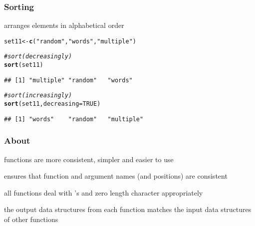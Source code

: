 \documentclass[12pt]{beamer}\usepackage[]{graphicx}\usepackage[]{color}
\makeatletter
\newcommand{\hlnum}[1]{\textcolor[rgb]{0.686,0.059,0.569}{#1}}%
\newcommand{\hlstr}[1]{\textcolor[rgb]{0.192,0.494,0.8}{#1}}%
\newcommand{\hlcom}[1]{\textcolor[rgb]{0.678,0.584,0.686}{\textit{#1}}}%
\newcommand{\hlstd}[1]{\textcolor[rgb]{0.345,0.345,0.345}{#1}}%
\newcommand{\hlkwb}[1]{\textcolor[rgb]{0.69,0.353,0.396}{#1}}%
\newcommand{\hlkwc}[1]{\textcolor[rgb]{0.333,0.667,0.333}{#1}}%
\newcommand{\hlkwd}[1]{\textcolor[rgb]{0.737,0.353,0.396}{\textbf{#1}}}%
\newenvironment{kframe}{%
 \def\at@end@of@kframe{}%
 \ifinner\ifhmode%
  \def\at@end@of@kframe{\end{minipage}}%
  \begin{minipage}{\columnwidth}%
 \fi\fi%
 \def\FrameCommand##1{\hskip\@totalleftmargin \hskip-\fboxsep
 \colorbox{shadecolor}{##1}\hskip-\fboxsep
     \hskip-\linewidth \hskip-\@totalleftmargin \hskip\columnwidth}%
 \MakeFramed {\advance\hsize-\width
   \@totalleftmargin\z@ \linewidth\hsize
   \@setminipage}}%
 {\par\unskip\endMakeFramed%
 \at@end@of@kframe}
\newenvironment{knitrout}{}{} %
\makeatother
\begin{document}

\begin{frame}[fragile]
\frametitle{Sorting}

 arranges elements in alphabetical order
\begin{knitrout}\footnotesize
{}\color{fgcolor}\begin{kframe}
\begin{alltt}
\hlstd{set11} \hlkwb{<-} \hlkwd{c}\hlstd{(}\hlstr{"random"}\hlstd{,} \hlstr{"words"}\hlstd{,} \hlstr{"multiple"}\hlstd{)}

\hlcom{# sort (decreasingly)}
\hlkwd{sort}\hlstd{(set11)}
\end{alltt}
\begin{verbatim}
## [1] "multiple" "random"   "words"
\end{verbatim}
\begin{alltt}
\hlcom{# sort (increasingly)}
\hlkwd{sort}\hlstd{(set11,} \hlkwc{decreasing} \hlstd{=} \hlnum{TRUE}\hlstd{)}
\end{alltt}
\begin{verbatim}
## [1] "words"    "random"   "multiple"
\end{verbatim}
\end{kframe}
\end{knitrout}

\end{frame}


\begin{frame}
\begin{center}
\Huge{}
\end{center}
\end{frame}


\begin{frame}
\frametitle{About }

\bi
  \item functions are more consistent, simpler and easier to use 
  \item {} ensures that function and argument names (and positions) are consistent
  \item all functions deal with 's and zero length character appropriately
  \item the output data structures from each function matches the input data structures of other functions
\ei
\eb

\end{frame}
\end{document}
